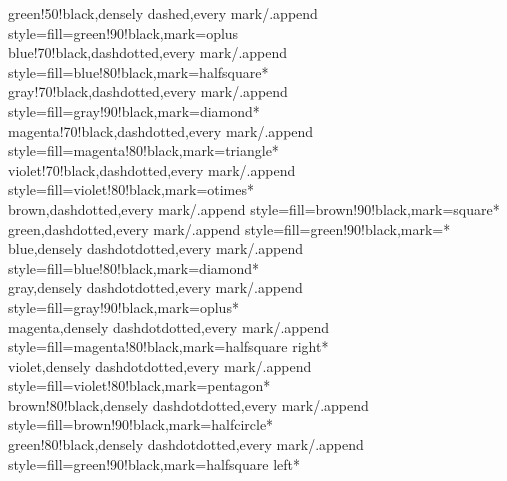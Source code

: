\documentclass[a4paper]{article}
\begin{document}
{	green!50!black,densely dashed,every mark/.append style={fill=green!90!black},mark=oplus\\
	blue!70!black,dashdotted,every mark/.append style={fill=blue!80!black},mark=halfsquare*\\
	gray!70!black,dashdotted,every mark/.append style={fill=gray!90!black},mark=diamond*\\
	magenta!70!black,dashdotted,every mark/.append style={fill=magenta!80!black},mark=triangle*\\
	violet!70!black,dashdotted,every mark/.append style={fill=violet!80!black},mark=otimes*\\
	brown,dashdotted,every mark/.append style={fill=brown!90!black},mark=square*\\
	green,dashdotted,every mark/.append style={fill=green!90!black},mark=*\\
	blue,densely dashdotdotted,every mark/.append style={fill=blue!80!black},mark=diamond*\\
	gray,densely dashdotdotted,every mark/.append style={fill=gray!90!black},mark=oplus*\\
	magenta,densely dashdotdotted,every mark/.append style={fill=magenta!80!black},mark=halfsquare right*\\
	violet,densely dashdotdotted,every mark/.append style={fill=violet!80!black},mark=pentagon*\\
	brown!80!black,densely dashdotdotted,every mark/.append style={fill=brown!90!black},mark=halfcircle*\\
	green!80!black,densely dashdotdotted,every mark/.append style={fill=green!90!black},mark=halfsquare left*\\
}
\end{document}
